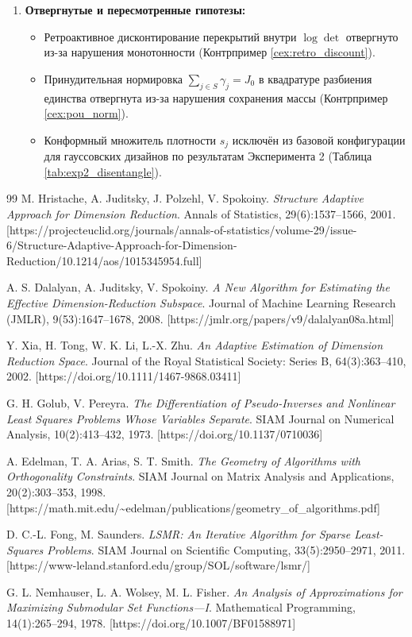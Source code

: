 \documentclass[11pt,a4paper]{article}
\theoremstyle{definition}
\theoremstyle{remark}
\begin{document}
\begin{enumerate}
\begin{itemize}
    \end{itemize}
    \item \textbf{Отвергнутые и пересмотренные гипотезы:}
    \begin{itemize}
        \item Ретроактивное дисконтирование перекрытий внутри $\log\det$ отвергнуто из-за нарушения монотонности (Контрпример \ref{cex:retro_discount}).
        \item Принудительная нормировка $\sum_{j \in S}\gamma_j = J_0$ в квадратуре разбиения единства отвергнута из-за нарушения сохранения массы (Контрпример \ref{cex:pou_norm}).
        \item Конформный множитель плотности $s_j$ исключён из базовой конфигурации для гауссовских дизайнов по результатам Эксперимента 2 (Таблица \ref{tab:exp2_disentangle}).
    \end{itemize}
\end{enumerate}

\begin{thebibliography}{99}\small
{}
M. Hristache, A. Juditsky, J. Polzehl, V. Spokoiny.
\emph{Structure Adaptive Approach for Dimension Reduction}.
Annals of Statistics, 29(6):1537--1566, 2001.
[https://projecteuclid.org/journals/annals-of-statistics/volume-29/issue-6/Structure-Adaptive-Approach-for-Dimension-Reduction/10.1214/aos/1015345954.full]

A. S. Dalalyan, A. Juditsky, V. Spokoiny.
\emph{A New Algorithm for Estimating the Effective Dimension-Reduction Subspace}.
Journal of Machine Learning Research (JMLR), 9(53):1647--1678, 2008.
[https://jmlr.org/papers/v9/dalalyan08a.html]

Y. Xia, H. Tong, W. K. Li, L.-X. Zhu.
\emph{An Adaptive Estimation of Dimension Reduction Space}.
Journal of the Royal Statistical Society: Series B, 64(3):363--410, 2002.
[https://doi.org/10.1111/1467-9868.03411]

G. H. Golub, V. Pereyra.
\emph{The Differentiation of Pseudo-Inverses and Nonlinear Least Squares Problems Whose Variables Separate}.
SIAM Journal on Numerical Analysis, 10(2):413--432, 1973.
[https://doi.org/10.1137/0710036]

A. Edelman, T. A. Arias, S. T. Smith.
\emph{The Geometry of Algorithms with Orthogonality Constraints}.
SIAM Journal on Matrix Analysis and Applications, 20(2):303--353, 1998.
[https://math.mit.edu/\textasciitilde{}edelman/publications/geometry\_of\_algorithms.pdf]

D. C.-L. Fong, M. Saunders.
\emph{LSMR: An Iterative Algorithm for Sparse Least-Squares Problems}.
SIAM Journal on Scientific Computing, 33(5):2950--2971, 2011.
[https://www-leland.stanford.edu/group/SOL/software/lsmr/]

G. L. Nemhauser, L. A. Wolsey, M. L. Fisher.
\emph{An Analysis of Approximations for Maximizing Submodular Set Functions---I}.
Mathematical Programming, 14(1):265--294, 1978.
[https://doi.org/10.1007/BF01588971]
\end{thebibliography}
\end{document}
